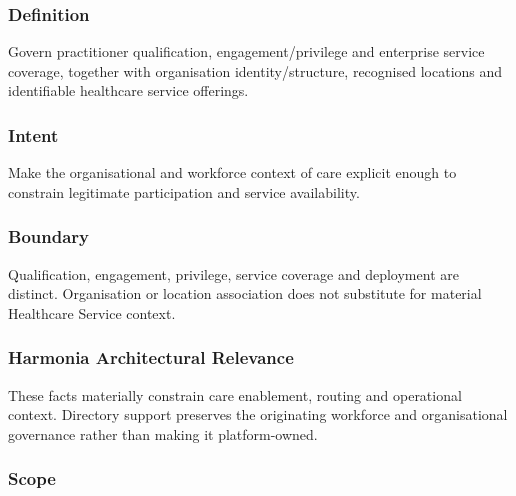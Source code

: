 \subsubsection*{Definition}

Govern practitioner qualification, engagement/\allowbreak{}privilege and enterprise service coverage, together with organisation identity/\allowbreak{}structure, recognised locations and identifiable healthcare service offerings.

\subsubsection*{Intent}

Make the organisational and workforce context of care explicit enough to constrain legitimate participation and service availability.

\subsubsection*{Boundary}

Qualification, engagement, privilege, service coverage and deployment are distinct. Organisation or location association does not substitute for material Healthcare Service context.

\subsubsection*{Harmonia Architectural Relevance}

These facts materially constrain care enablement, routing and operational context. Directory support preserves the originating workforce and organisational governance rather than making it platform-owned.

\subsubsection*{Scope}
